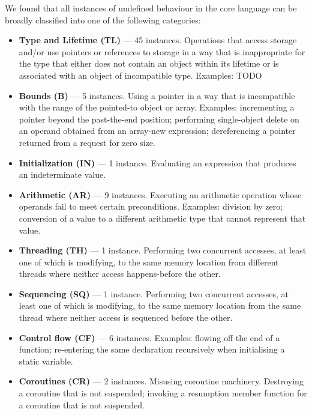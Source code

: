 We found that all instances of undefined behaviour in the core language can be broadly classified into one of the following  categories:
\begin{itemize}
\item \textbf{Type and Lifetime (TL)} --- 45 instances. Operations that access storage and/or use pointers or references to storage in a way that is  inappropriate for the type that either does not contain an object within its lifetime or is associated with an object of incompatible type. Examples: 
TODO
\item \textbf{Bounds (B)} --- 5 instances. Using a pointer in a way that is incompatible with the range of the pointed-to object or array. Examples: incrementing a pointer beyond the past-the-end position; performing single-object delete on an operand obtained from an array-new expression;  dereferencing a pointer returned from a request for zero size.
\item \textbf{Initialization (IN)} --- 1 instance. Evaluating an expression that produces an indeterminate value.
\item \textbf{Arithmetic (AR)} --- 9 instances. Executing an arithmetic operation whose operands fail to meet certain preconditions. Examples: division by zero; conversion of a value to a different arithmetic type that cannot represent that value. 
\item \textbf{Threading (TH)} --- 1 instance. Performing two concurrent accesses, at least one of which is modifying, to the same memory location from different threads where neither access happens-before the other.
\item \textbf{Sequencing (SQ)} --- 1 instance. Performing two concurrent accesses, at least one of which is modifying, to the same memory location from the same thread where neither access is sequenced before the other.
\item \textbf{Control flow (CF)} --- 6 instances. Examples: flowing off the end of a function; re-entering the same declaration recursively when initialising a static variable.
\item \textbf{Coroutines (CR)} --- 2 instances. Misusing coroutine machinery. Destroying a coroutine that is not suspended; invoking a resumption member function for a coroutine that is not suspended.

\end{itemize}
